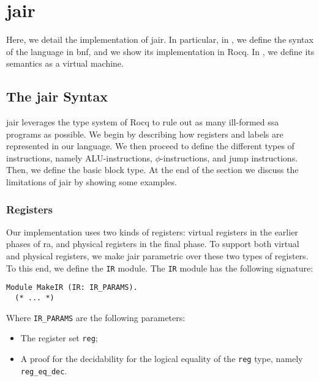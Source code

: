 
\chapter{\gls{jair}}
\label{cha:jair}

Here, we detail the implementation of \gls{jair}. In particular, in , we define the syntax of the language in \gls{bnf}, and we show its implementation in Rocq. In , we define its semantics as a virtual machine.

\section{The \gls{jair} Syntax}
\label{sec:jair-syntax}

\gls{jair} leverages the type system of Rocq to rule out as many ill-formed \gls{ssa} programs as possible. We begin by describing how registers and labels are represented in our language. We then proceed to define the different types of instructions, namely ALU-instructions, $\phi$-instructions, and jump instructions. Then, we define the basic block type.
At the end of the section we discuss the limitations of \gls{jair} by showing some examples.

\subsection{Registers}

Our implementation uses two kinds of registers: virtual registers in the earlier phases of \gls{ra}, and physical registers in the final phase. To support both virtual and physical registers, we make \gls{jair} parametric over these two types of registers. To this end, we define the \texttt{IR} module. The \texttt{IR} module has the following signature:

\begin{lstlisting}[style=Rocq]
Module MakeIR (IR: IR_PARAMS).
  (* ... *)
\end{lstlisting}

Where \texttt{IR\_PARAMS} are the following parameters:
\begin{itemize}
    \item The register set \texttt{reg};
    \item A proof for the decidability for the logical equality of the \texttt{reg} type, namely \texttt{reg\_eq\_dec}.
\end{itemize}


